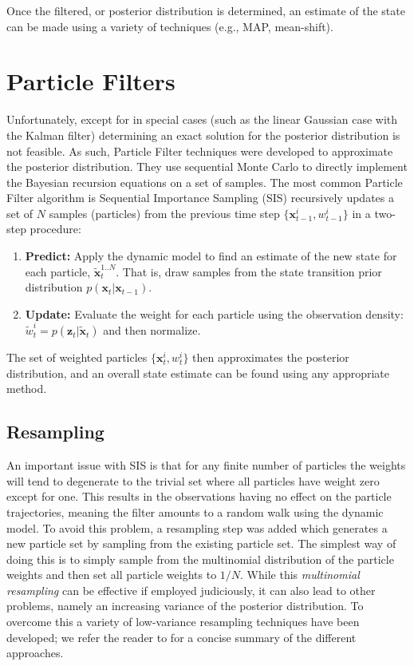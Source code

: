 Once the filtered, or posterior distribution is determined, an estimate of the state can be made using a variety of techniques (e.g., MAP, mean-shift). 

\section{Particle Filters}
Unfortunately, except for in special cases (such as the linear Gaussian case with the Kalman filter) determining an exact solution for the posterior distribution is not feasible. As such, Particle Filter techniques were developed to approximate the posterior distribution. They use sequential Monte Carlo to directly implement the Bayesian recursion equations on a set of samples. The most common Particle Filter algorithm is Sequential Importance Sampling (SIS) recursively updates a set of $N$ samples (particles) from the previous time step $\{ \mathbf{x}^{i}_{t-1}, w^i_{t-1} \}$ in a two-step procedure: 

\begin{enumerate}
 \item \textbf{Predict:} Apply the dynamic model to find an estimate of the new state for each particle, $\tilde{\mathbf{x}}^{1..N}_t$. That is, draw samples from the state transition prior distribution $\mathit{p}(\mathbf{x}_t|\mathbf{x}_{t-1})$.
 \item \textbf{Update:} Evaluate the weight for each particle using the observation density:  $\tilde{w}^i_t = \mathit{p}(\mathbf{z}_t|\tilde{\mathbf{x}}_{t})$ and then normalize.
\end{enumerate}

The set of weighted particles $\{ \mathbf{x}^{i}_{t}, w^i_{t} \}$ then approximates the posterior distribution, and an overall state estimate can be found using any appropriate method.

\subsection{Resampling}
An important issue with SIS is that for any finite number of particles the weights will tend to degenerate to the trivial set where all particles have weight zero except for one. This results in the observations having no effect on the particle trajectories, meaning the filter amounts to a random walk using the dynamic model. To avoid this problem, a resampling step was added \cite{GordonEtAlPf, Rubin:SIR} which generates a new particle set by sampling from the existing particle set. The simplest way of doing this is to simply sample from the multinomial distribution of the particle weights and then set all particle weights to $1/N$. While this \textit{multinomial resampling} can be effective if employed judiciously, it can also lead to other problems, namely an increasing variance of the posterior distribution. To overcome this a variety of low-variance resampling techniques have been developed; we refer the reader to \cite{Douce:Resampling} for a concise summary of the different approaches.


